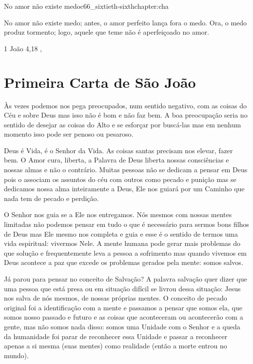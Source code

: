 \begin{chapterpage}{No amor não existe medo}{c66_sixtieth-sixthchapter:cha}
 
\begin{myquotation} No amor não existe medo; antes, o amor perfeito lança fora o medo. Ora, o medo produz tormento; logo, aquele que teme não é aperfeiçoado no amor. 
\par\vspace*{15mm}
\mbox{}\hfill \emdash{}1 João 4,18
, %
\par\end{myquotation}

\end{chapterpage}



\section{Primeira Carta de São João}\label{c1_basicformatting:sec}

\emdash{}Às vezes podemos nos pega preocupados, num sentido negativo, com as coisas do Céu e sobre Deus mas isso não é bom e não faz bem. A boa preocupação seria no sentido de desejar as coisas do Alto e se esforçar por buscá-las mas em nenhum momento isso pode ser penoso ou pesaroso.

\emdash{}Deus é Vida, é o Senhor da Vida. As coisas santas precisam nos elevar, fazer bem. O Amor cura, liberta, a Palavra de Deus liberta nossas consciências e nossas almas e não o contrário. Muitas pessoas não se dedicam a pensar em Deus pois o associam os assuntos do céu com outros como pecado e punição mas se dedicamos nossa alma inteiramente a Deus, Ele nos guiará por um Caminho que nada tem de pecado e perdição.

\emdash{}O Senhor nos guia se a Ele nos entregamos. Nós mesmos com nossas mentes limitadas não podemos pensar em tudo o que é necessário para sermos bons filhos de Deus mas Ele mesmo nos completa e guia e esse é o sentido de termos uma vida espiritual: vivermos Nele. A mente humana pode gerar mais problemas do que solução e frequentemente leva a pessoa a sofrimento mas quando vivemos em Deus acontece a paz que excede os problemas gerados pela mente: somos salvos.

\emdash{}Já parou para pensar no conceito de Salvação? A palavra salvação quer dizer que uma pessoa que está presa ou em situação difícil se livrou dessa situação: Jesus nos salva de nós mesmos, de nossas próprias mentes. O conceito de pecado original foi a identificação com a mente e passamos a pensar que somos ela, que somos nosso passado e futuro e as coisas que aconteceram ou acontecerão com a gente, mas não somos nada disso: somos uma Unidade com o Senhor e a queda da humanidade foi parar de reconhecer essa Unidade e passar a reconhecer apenas a si mesma (suas mentes) como realidade (então a morte entrou no mundo).

